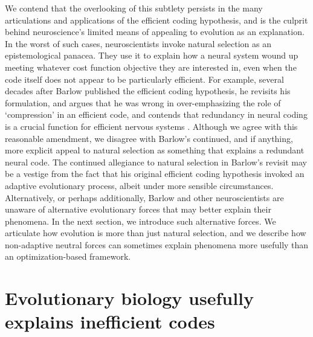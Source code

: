 \documentclass[twocolumn]{article}
\begin{document}

We contend that the overlooking of this subtlety persists in the many articulations and applications of the efficient coding hypothesis, and is the culprit behind neuroscience's limited means of appealing to evolution as an explanation. In the worst of such cases, neuroscientists invoke natural selection as an epistemological panacea. They use it to explain how a neural system wound up meeting whatever cost function objective they are interested in, even when the code itself does not appear to be particularly efficient. For example, several decades after Barlow published the efficient coding hypothesis, he revisits his formulation, and argues that he was wrong in over-emphasizing the role of `compression' in an efficient code, and contends that redundancy in neural coding is a crucial function for efficient nervous systems \cite{barlow_2001}. Although we agree with this reasonable amendment, we disagree with Barlow's continued, and if anything, more explicit appeal to natural selection as something that explains a redundant neural code. The continued allegiance to natural selection in Barlow's revisit may be a vestige from the fact that his original efficient coding hypothesis invoked an adaptive evolutionary process, albeit under more sensible circumstances. Alternatively, or perhaps additionally, Barlow and other neuroscientists are unaware of alternative evolutionary forces that may better explain their phenomena. In the next section, we introduce such alternative forces. We articulate how evolution is more than just natural selection, and we describe how non-adaptive neutral forces can sometimes explain phenomena more usefully than an optimization-based framework. 




\section{Evolutionary biology usefully explains inefficient codes}
\end{document}
